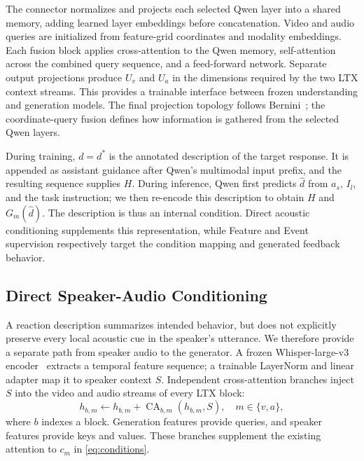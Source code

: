 The connector normalizes and projects each selected Qwen layer into a
shared memory, adding learned layer embeddings before concatenation.
Video and audio queries are initialized from feature-grid coordinates
and modality embeddings. Each fusion block applies cross-attention to
the Qwen memory, self-attention across the combined query sequence, and
a feed-forward network. Separate output projections produce $U_v$ and
$U_a$ in the dimensions required by the two LTX context streams. This
provides a trainable interface between frozen understanding and generation
models. The final projection topology follows Bernini~\cite{bernini_pending};
the coordinate-query fusion defines how information is gathered from the
selected Qwen layers.

During training, $d=d^*$ is the annotated description of the target
response. It is appended as assistant guidance after Qwen's multimodal
input prefix, and the resulting sequence supplies $H$. During inference,
Qwen first predicts $\hat d$ from $a_s$, $I_l$, and the task instruction;
we then re-encode this description to obtain $H$ and $G_m(\hat d)$.
The description is thus an internal condition. Direct acoustic
conditioning supplements this representation, while Feature and Event
supervision respectively target the condition mapping and generated
feedback behavior.

\subsection{Direct Speaker-Audio Conditioning}
\label{sec:direct-audio}
A reaction description summarizes intended behavior, but does not
explicitly preserve every local acoustic cue in the speaker's utterance.
We therefore provide a separate path from speaker audio to the generator.
A frozen Whisper-large-v3 encoder~\cite{whisper} extracts a temporal
feature sequence; a trainable LayerNorm and linear adapter map it to
speaker context $S$. Independent cross-attention branches inject $S$
into the video and audio streams of every LTX block:
\begin{equation}
 h_{b,m}\leftarrow h_{b,m}
 +\operatorname{CA}_{b,m}(h_{b,m},S),\quad m\in\{v,a\},
\label{eq:speaker-attention}
\end{equation}
where $b$ indexes a block. Generation features provide queries, and
speaker features provide keys and values. These branches supplement
the existing attention to $c_m$ in \cref{eq:conditions}.

